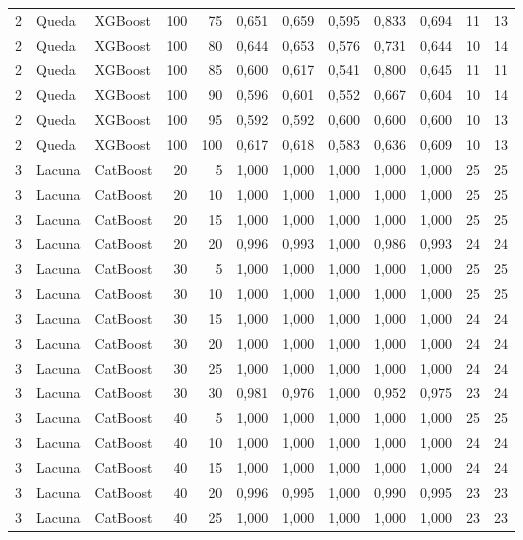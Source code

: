 \begin{longtable}{@{}rllrrrrrrrrr@{}}
2 & Queda & XGBoost & 100 & 75 & 0,651 & 0,659 & 0,595 & 0,833 & 0,694 & 11 & 13 \\
2 & Queda & XGBoost & 100 & 80 & 0,644 & 0,653 & 0,576 & 0,731 & 0,644 & 10 & 14 \\
2 & Queda & XGBoost & 100 & 85 & 0,600 & 0,617 & 0,541 & 0,800 & 0,645 & 11 & 11 \\
2 & Queda & XGBoost & 100 & 90 & 0,596 & 0,601 & 0,552 & 0,667 & 0,604 & 10 & 14 \\
2 & Queda & XGBoost & 100 & 95 & 0,592 & 0,592 & 0,600 & 0,600 & 0,600 & 10 & 13 \\
2 & Queda & XGBoost & 100 & 100 & 0,617 & 0,618 & 0,583 & 0,636 & 0,609 & 10 & 13 \\
3 & Lacuna & CatBoost & 20 & 5 & 1,000 & 1,000 & 1,000 & 1,000 & 1,000 & 25 & 25 \\
3 & Lacuna & CatBoost & 20 & 10 & 1,000 & 1,000 & 1,000 & 1,000 & 1,000 & 25 & 25 \\
3 & Lacuna & CatBoost & 20 & 15 & 1,000 & 1,000 & 1,000 & 1,000 & 1,000 & 25 & 25 \\
3 & Lacuna & CatBoost & 20 & 20 & 0,996 & 0,993 & 1,000 & 0,986 & 0,993 & 24 & 24 \\
3 & Lacuna & CatBoost & 30 & 5 & 1,000 & 1,000 & 1,000 & 1,000 & 1,000 & 25 & 25 \\
3 & Lacuna & CatBoost & 30 & 10 & 1,000 & 1,000 & 1,000 & 1,000 & 1,000 & 25 & 25 \\
3 & Lacuna & CatBoost & 30 & 15 & 1,000 & 1,000 & 1,000 & 1,000 & 1,000 & 24 & 24 \\
3 & Lacuna & CatBoost & 30 & 20 & 1,000 & 1,000 & 1,000 & 1,000 & 1,000 & 24 & 24 \\
3 & Lacuna & CatBoost & 30 & 25 & 1,000 & 1,000 & 1,000 & 1,000 & 1,000 & 24 & 24 \\
3 & Lacuna & CatBoost & 30 & 30 & 0,981 & 0,976 & 1,000 & 0,952 & 0,975 & 23 & 24 \\
3 & Lacuna & CatBoost & 40 & 5 & 1,000 & 1,000 & 1,000 & 1,000 & 1,000 & 25 & 25 \\
3 & Lacuna & CatBoost & 40 & 10 & 1,000 & 1,000 & 1,000 & 1,000 & 1,000 & 24 & 24 \\
3 & Lacuna & CatBoost & 40 & 15 & 1,000 & 1,000 & 1,000 & 1,000 & 1,000 & 24 & 24 \\
3 & Lacuna & CatBoost & 40 & 20 & 0,996 & 0,995 & 1,000 & 0,990 & 0,995 & 23 & 23 \\
3 & Lacuna & CatBoost & 40 & 25 & 1,000 & 1,000 & 1,000 & 1,000 & 1,000 & 23 & 23 \\

\end{longtable}
